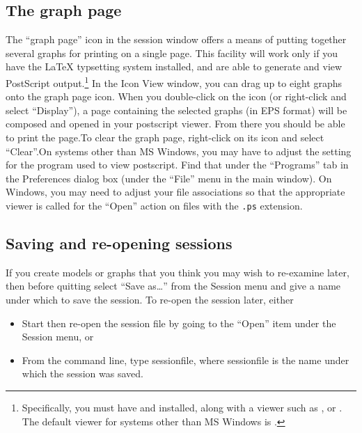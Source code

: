 \subsection{The graph page}
\label{sect-graphpage}

The ``graph page'' icon in the session window offers a means of
putting together several graphs for printing on a single page.  This
facility will work only if you have the {\LaTeX} typsetting system
installed, and are able to generate and view PostScript
output.\footnote{Specifically, you must have  and
   installed, along with a viewer such as ,
   or . The default viewer for systems other
  than MS Windows is .}  In the Icon View window, you can drag
up to eight graphs onto the graph page icon.  When you double-click on
the icon (or right-click and select ``Display''), a page containing
the selected graphs (in EPS format) will be composed and opened in
your postscript viewer.  From there you should be able to print the
page.To clear the graph page, right-click on its icon and select
``Clear''.On systems other than MS Windows, you may have to adjust the
setting for the program used to view postscript.  Find that under the
``Programs'' tab in the Preferences dialog box (under the ``File''
menu in the main window).  On Windows, you may need to adjust your
file associations so that the appropriate viewer is called for the
``Open'' action on files with the \verb+.ps+ extension.

\subsection{Saving and re-opening sessions}
\label{session-save}

If you create models or graphs that you think you may wish to
re-examine later, then before quitting  select ``Save
as\dots{}'' from the Session menu and give a name under which to save
the session.  To re-open the session later, either
\begin{itemize}
\item Start  then re-open the session file by going to the
  ``Open'' item under the Session menu, or
\item From the command line, type  sessionfile, where
  sessionfile is the name under which the session was saved.
\end{itemize}



